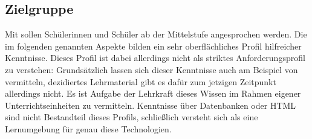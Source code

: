 
\subsection{Zielgruppe}
\label{sec:target-audience}

Mit \idename sollen Schülerinnen und Schüler ab der Mittelstufe angesprochen werden. Die im folgenden genannten Aspekte bilden ein sehr oberflächliches Profil hilfreicher Kenntnisse. Dieses Profil ist dabei allerdings nicht als striktes Anforderungsprofil zu verstehen: Grundsätzlich lassen sich dieser Kenntnisse auch am Beispiel von \idename vermitteln, dezidiertes Lehrmaterial gibt es dafür zum jetzigen Zeitpunkt allerdings nicht. Es ist Aufgabe der Lehrkraft dieses Wissen im Rahmen eigener Unterrichtseinheiten zu vermitteln. Kenntnisse über Datenbanken oder HTML sind nicht Bestandteil dieses Profils, schließlich versteht sich \idename als eine Lernumgebung für genau diese Technologien.

